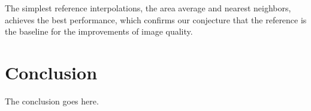 \documentclass[journal,conference]{IEEEtran}
\begin{document}
The simplest reference interpolations, the area average and nearest neighbors, achieves the best performance, which confirms our conjecture that the reference is the baseline for the improvements of image quality.

\section{Conclusion}
The conclusion goes here.










\end{document}

